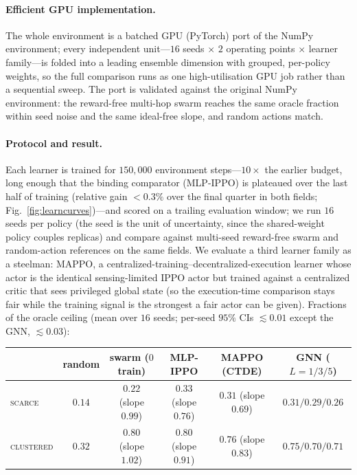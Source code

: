 \documentclass{article}
\begin{document}
\paragraph{Efficient GPU implementation.} The whole environment is a batched GPU (PyTorch) port of the NumPy
environment; every independent unit---$16$ seeds $\times$ $2$ operating points $\times$ learner family---is
folded into a leading ensemble dimension with grouped, per-policy weights, so the full comparison runs as one
high-utilisation GPU job rather than a sequential sweep. The port is validated against the original NumPy
environment: the reward-free multi-hop swarm reaches the same oracle fraction within seed noise and the same
ideal-free slope, and random actions match.

\paragraph{Protocol and result.} Each learner is trained for $150{,}000$ environment steps---$10\times$ the
earlier budget, long enough that the binding comparator (MLP-IPPO) is plateaued over the last half of training
(relative gain ${<}0.3\%$ over the final quarter in both fields; Fig.~\ref{fig:learncurves})---and scored on a
trailing evaluation window; we run $16$ seeds per policy (the seed is the unit of uncertainty, since the
shared-weight policy couples replicas) and compare against multi-seed reward-free swarm and random-action
references on the same fields. We evaluate a third learner family as a steelman: MAPPO, a
centralized-training--decentralized-execution learner whose actor is the identical sensing-limited IPPO actor but
trained against a centralized critic that sees privileged global state (so the execution-time comparison stays
fair while the training signal is the strongest a fair actor can be given). Fractions of the oracle ceiling
(mean over $16$ seeds; per-seed $95\%$ CIs $\lesssim0.01$ except the GNN, $\lesssim0.03$):

\begin{center}{\small
\begin{tabular}{@{}lccccc@{}}
\hline
 & random & swarm ($0$ train) & MLP-IPPO & MAPPO (CTDE) & GNN ($L{=}1/3/5$) \\
\hline
\textsc{scarce}    & $0.14$ & $0.22$ (slope $0.99$) & $0.33$ (slope $0.76$) & $0.31$ (slope $0.69$) & $0.31/0.29/0.26$ \\
\textsc{clustered} & $0.32$ & $0.80$ (slope $1.02$) & $0.80$ (slope $0.91$) & $0.76$ (slope $0.83$) & $0.75/0.70/0.71$ \\
\hline
\end{tabular}}\end{center}
\end{document}
